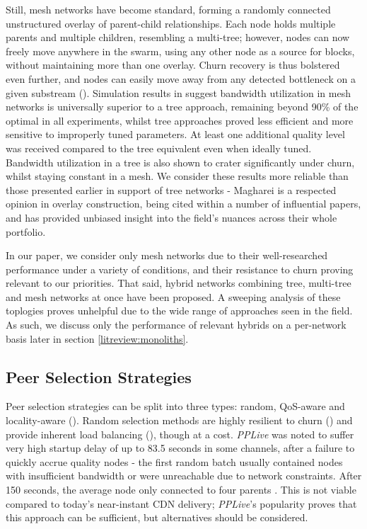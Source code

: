 \documentclass[12pt,a4paper]{article}
\begin{document}
Still, mesh networks have become standard, forming a randomly connected unstructured overlay of parent-child relationships. Each node holds multiple parents and multiple children, resembling a multi-tree; however, nodes can now freely move anywhere in the swarm, using any other node as a source for blocks, without maintaining more than one overlay. Churn recovery is thus bolstered even further, and nodes can easily move away from any detected bottleneck on a given substream (\cite{Magharei2006}). Simulation results in \cite{Magharei2007} suggest bandwidth utilization in mesh networks is universally superior to a tree approach, remaining beyond 90\% of the optimal in all experiments, whilst tree approaches proved less efficient and more sensitive to improperly tuned parameters. At least one additional quality level was received compared to the tree equivalent even when ideally tuned. Bandwidth utilization in a tree is also shown to crater significantly under churn, whilst staying constant in a mesh. We consider these results more reliable than those presented earlier in support of tree networks - Magharei is a respected opinion in overlay construction, being cited within a number of influential papers, and has provided unbiased insight into the field's nuances across their whole portfolio.

In our paper, we consider only mesh networks due to their well-researched performance under a variety of conditions, and their resistance to churn proving relevant to our priorities. That said, hybrid networks combining tree, multi-tree and mesh networks at once have been proposed. A sweeping analysis of these toplogies proves unhelpful due to the wide range of approaches seen in the field. As such, we discuss only the performance of relevant hybrids on a per-network basis later in section \ref{litreview:monoliths}.

\subsection{Peer Selection Strategies} \label{litreview:selection}
Peer selection strategies can be split into three types: random, QoS-aware and locality-aware (\cite{Kim2018}). Random selection methods are highly resilient to churn (\cite{Vishnumurthy2007}) and provide inherent load balancing (\cite{Wang2008}), though at a cost. \textit{PPLive} was noted to suffer very high startup delay of up to 83.5 seconds in some channels, after a failure to quickly accrue quality nodes - the first random batch usually contained nodes with insufficient bandwidth or were unreachable due to network constraints. After 150 seconds, the average node only connected to four parents \cite{Hei2008}. This is not viable compared to today's near-instant CDN delivery; \textit{PPLive}'s popularity proves that this approach can be sufficient, but alternatives should be considered.
\end{document}
